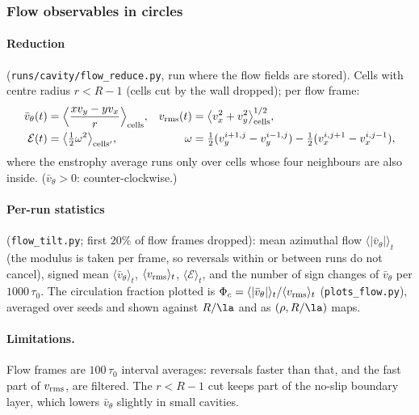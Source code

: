 \subsubsection{Flow observables in circles}
\label{sec:md-flow}

\paragraph{Reduction} (\texttt{runs/cavity/flow\_reduce.py}, run where the flow fields are stored). Cells with centre radius
$r<R-1$ (cells cut by the wall dropped); per flow frame:
\begin{align}
  \bar v_\theta(t)&=\Big\langle\frac{x v_y-y v_x}{r}\Big\rangle_{\rm cells},&
  v_{\rm rms}(t)&=\big\langle v_x^2+v_y^2\big\rangle_{\rm cells}^{1/2},\\
  \mathcal E(t)&=\big\langle\tfrac12\omega^2\big\rangle_{\rm cells'},&
  \omega&=\tfrac12(v_y^{i+1,j}-v_y^{i-1,j})-\tfrac12(v_x^{i,j+1}-v_x^{i,j-1}),
\end{align}
where the enstrophy average runs only over cells whose four neighbours are also inside. ($\bar v_\theta>0$: counter-clockwise.)

\paragraph{Per-run statistics} (\texttt{flow\_tilt.py}; first $20\%$ of flow frames dropped): mean azimuthal flow
$\langle|\bar v_\theta|\rangle_t$ (the modulus is taken per frame, so reversals within or between runs do not cancel), signed mean
$\langle\bar v_\theta\rangle_t$, $\langle v_{\rm rms}\rangle_t$, $\langle\mathcal E\rangle_t$, and the number of sign changes of $\bar v_\theta$
per $1000\,\tau_0$. The circulation fraction plotted is $\Phi_c=\langle|\bar v_\theta|\rangle_t/\langle v_{\rm rms}\rangle_t$
(\texttt{plots\_flow.py}), averaged over seeds and shown against $R/\la$ and as $(\rho,R/\la)$ maps.
\paragraph{Limitations.} Flow frames are $100\,\tau_0$ interval averages: reversals faster than that, and the fast part of $v_{\rm rms}$,
are filtered. The $r<R-1$ cut keeps part of the no-slip boundary layer, which lowers $\bar v_\theta$ slightly in small cavities.

